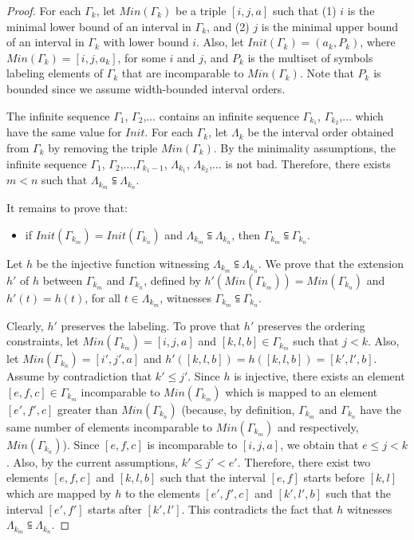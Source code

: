 \begin{proof}
For each $\Gamma_k$, let $Min(\Gamma_k)$ be a triple $[i,j,a]$ such that 
(1) $i$ is the minimal lower bound of an interval in $\Gamma_k$, and 
(2) $j$ is the minimal upper bound of an interval in $\Gamma_k$ with lower bound $i$.
Also, let $Init(\Gamma_k) = (a_k, P_k)$, where $Min(\Gamma_k)=[i,j,a_k]$, for some $i$ and $j$, and $P_k$ is the multiset of symbols labeling elements of $\Gamma_k$ that are incomparable to $Min(\Gamma_k)$. Note that $P_k$ is bounded since we assume width-bounded interval orders.

The infinite sequence $\Gamma_1$, $\Gamma_2$,$\ldots$ contains an infinite sequence $\Gamma_{k_1}$, $\Gamma_{k_2}$,$\ldots$ which have the same value for $Init$.
For each $\Gamma_k$, let $\Lambda_k$ be the interval order obtained from $\Gamma_k$ by removing the triple $Min(\Gamma_k)$.
By the minimality assumptions, the infinite sequence $\Gamma_1$, $\Gamma_2$,$\ldots$,$\Gamma_{k_1-1}$, $\Lambda_{k_1}$, $\Lambda_{k_2}$,$\ldots$ is not bad. 
Therefore, there exists $m<n$ such that $\Lambda_{k_m}\subseteqq \Lambda_{k_n}$. 

It remains to prove that:
\begin{itemize}
	\item if $Init(\Gamma_{k_m})=Init(\Gamma_{k_n})$ and $\Lambda_{k_m}\subseteqq \Lambda_{k_n}$, then $\Gamma_{k_m}\subseteqq \Gamma_{k_n}$.
\end{itemize}

Let $h$ be the injective function witnessing $\Lambda_{k_m}\subseteqq \Lambda_{k_n}$. We prove that the extension $h'$ of $h$ between $\Gamma_{k_m}$ and $\Gamma_{k_n}$, defined by $h'(Min(\Gamma_{k_m}))=Min(\Gamma_{k_n})$ and $h'(t)=h(t)$, for all $t\in \Lambda_{k_m}$, witnesses $\Gamma_{k_m}\subseteqq \Gamma_{k_n}$. 

Clearly, $h'$ preserves the labeling. 
To prove that $h'$ preserves the ordering constraints, let $Min(\Gamma_{k_m})=[i,j,a]$ and $[k,l,b]\in \Gamma_{k_m}$ such that $j< k$. Also, let $Min(\Gamma_{k_n})=[i',j',a]$ and $h'([k,l,b])=h([k,l,b])=[k',l',b]$. Assume by contradiction that $k'\leq j'$. Since $h$ is injective, there exists an element $[e,f,c]\in \Gamma_{k_m}$ incomparable to $Min(\Gamma_{k_m})$ which is mapped to an element $[e',f',c]$ greater than $Min(\Gamma_{k_n})$ (because, by definition, $\Gamma_{k_m}$ and $\Gamma_{k_n}$ have the same number of elements incomparable to $Min(\Gamma_{k_m})$ and respectively, $Min(\Gamma_{k_n})$). 
Since $[e,f,c]$ is incomparable to $[i,j,a]$, we obtain that $e\leq j< k$. Also, by the current assumptions, $k'\leq j'<e'$. Therefore, there exist two elements $[e,f,c]$ and $[k,l,b]$ such that the interval $[e,f]$ starts before $[k,l]$ which are mapped by $h$ to the elements $[e',f',c]$ and $[k',l',b]$ such that the interval $[e',f']$ starts after $[k',l']$. This contradicts the fact that $h$ witnesses $\Lambda_{k_m}\subseteqq \Lambda_{k_n}$.


\end{proof}
